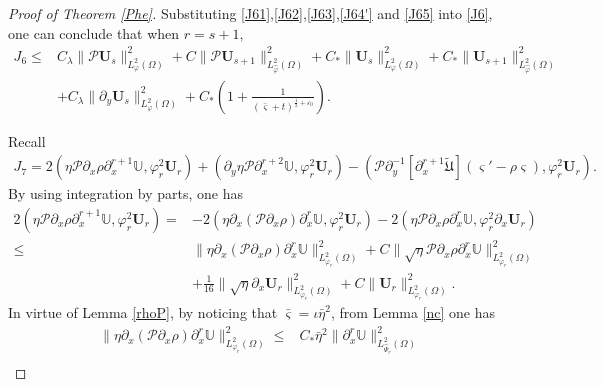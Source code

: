 \documentclass[10pt,a4paper]{amsart}
\begin{document}
\begin{proof}[Proof of Theorem \ref{Phe}]
Substituting \eqref{J61},\eqref{J62},\eqref{J63},\eqref{J64'} and \eqref{J65} into \eqref{J6}, one can conclude that when $r=s+1$,
\begin{align}\label{J6'}
J_{6}
\leq& C_{\lambda}\|\mathcal{P}\mathbf{U}_{s}\|_{L_{\varphi}^{2}(\Omega)}^{2}
     +C\|\mathcal{P}\mathbf{U}_{s+1}\|_{L_{\hat{\varphi}}^{2}(\Omega)}^{2}
     +C_{*}\|\mathbf{U}_{s}\|_{L_{\varphi}^{2}(\Omega)}^{2}
     +C_{*}\|\mathbf{U}_{s+1}\|_{L_{\hat{\varphi}}^{2}(\Omega)}^{2}\\
    &+C_{\lambda}\|\partial_{y}\mathbf{U}_{s}\|_{L_{\varphi}^{2}(\Omega)}^{2}
     +C_{*}\left(1+\frac{1}{(\bar{\varsigma}+t)^{\frac{1}{2}+\varepsilon_{0}}}\right).\nonumber
\end{align}


Recall
\begin{align}\label{J7}
J_{7}
= 2(\eta\mathcal{P}\partial_{x}\rho\partial_{x}^{r+1}\mathbb{U},\varphi_{r}^{2}\mathbf{U}_{r})
 +(\partial_{y}\eta\mathcal{P}\partial_{x}^{r+2}\mathbb{U},\varphi_{r}^{2}\mathbf{U}_{r})
 -(\mathcal{P}\partial_{y}^{-1}[\partial_{x}^{r+1}\tilde{\mathfrak{U}}](\varsigma'-\rho\varsigma),\varphi_{r}^{2}\mathbf{U}_{r}).
\end{align}
By using integration by parts, one has
\begin{align}\label{J71}
2(\eta\mathcal{P}\partial_{x}\rho\partial_{x}^{r+1}\mathbb{U},\varphi_{r}^{2}\mathbf{U}_{r})
=&-2(\eta\partial_{x}(\mathcal{P}\partial_{x}\rho)\partial_{x}^{r}\mathbb{U},\varphi_{r}^{2}\mathbf{U}_{r})
 -2(\eta\mathcal{P}\partial_{x}\rho\partial_{x}^{r}\mathbb{U},\varphi_{r}^{2}\partial_{x}\mathbf{U}_{r})\\
\leq& \|\eta\partial_{x}(\mathcal{P}\partial_{x}\rho)\partial_{x}^{r}\mathbb{U}\|_{L_{\varphi_{r}}^{2}(\Omega)}^{2}
     +C\|\sqrt{\eta}\mathcal{P}\partial_{x}\rho\partial_{x}^{r}\mathbb{U}\|_{L_{\varphi_{r}}^{2}(\Omega)}^{2}\nonumber\\
    &+\frac{1}{16}\|\sqrt{\eta}\partial_{x}\mathbf{U}_{r}\|_{L_{\varphi_{r}}^{2}(\Omega)}^{2}
     +C\|\mathbf{U}_{r}\|_{L_{\varphi_{r}}^{2}(\Omega)}^{2}.\nonumber
\end{align}
In virtue of Lemma \ref{rhoP}, by noticing that $\bar{\varsigma}=\iota\bar{\eta}^{2}$,
from Lemma \ref{nc} one has
\begin{align}\label{J711}
\|\eta\partial_{x}(\mathcal{P}\partial_{x}\rho)\partial_{x}^{r}\mathbb{U}\|_{L_{\varphi_{r}}^{2}(\Omega)}^{2}
\leq& C_{*}\bar{\eta}^{2}\|\partial_{x}^{r}\mathbb{U}\|_{L_{\hat{\Psi}_{r}}^{2}(\Omega)}^{2}\\

\end{align}
\end{proof}
\end{document}
